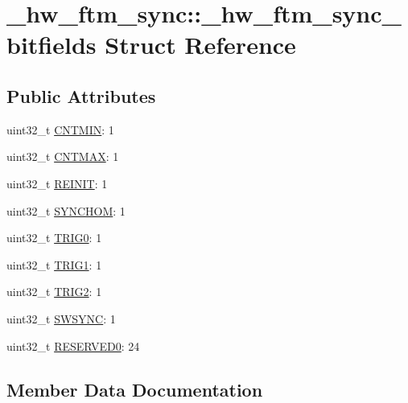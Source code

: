 \hypertarget{struct__hw__ftm__sync_1_1__hw__ftm__sync__bitfields}{}\section{\+\_\+hw\+\_\+ftm\+\_\+sync\+:\+:\+\_\+hw\+\_\+ftm\+\_\+sync\+\_\+bitfields Struct Reference}
\label{struct__hw__ftm__sync_1_1__hw__ftm__sync__bitfields}
\subsection*{Public Attributes}
\begin{DoxyCompactItemize}
\item 
uint32\+\_\+t \hyperlink{struct__hw__ftm__sync_1_1__hw__ftm__sync__bitfields_a13edc8c6f5b27e0fd01024896a210a90}{C\+N\+T\+M\+IN}\+: 1
\item 
uint32\+\_\+t \hyperlink{struct__hw__ftm__sync_1_1__hw__ftm__sync__bitfields_a528a1085734f901c36e665ba9facd349}{C\+N\+T\+M\+AX}\+: 1
\item 
uint32\+\_\+t \hyperlink{struct__hw__ftm__sync_1_1__hw__ftm__sync__bitfields_a1530460cab415fa245955a40722460bb}{R\+E\+I\+N\+IT}\+: 1
\item 
uint32\+\_\+t \hyperlink{struct__hw__ftm__sync_1_1__hw__ftm__sync__bitfields_a9b00704111fea19728562620e13d2ae9}{S\+Y\+N\+C\+H\+OM}\+: 1
\item 
uint32\+\_\+t \hyperlink{struct__hw__ftm__sync_1_1__hw__ftm__sync__bitfields_a5322fd5a4586d08fa00182e3d739e8da}{T\+R\+I\+G0}\+: 1
\item 
uint32\+\_\+t \hyperlink{struct__hw__ftm__sync_1_1__hw__ftm__sync__bitfields_ac6a31a466c50bb16ec45521116caf71b}{T\+R\+I\+G1}\+: 1
\item 
uint32\+\_\+t \hyperlink{struct__hw__ftm__sync_1_1__hw__ftm__sync__bitfields_a3f970aa073d94c19ab570ca1f01fd014}{T\+R\+I\+G2}\+: 1
\item 
uint32\+\_\+t \hyperlink{struct__hw__ftm__sync_1_1__hw__ftm__sync__bitfields_a4c4416e7665d9887604a7faa3efd97f0}{S\+W\+S\+Y\+NC}\+: 1
\item 
uint32\+\_\+t \hyperlink{struct__hw__ftm__sync_1_1__hw__ftm__sync__bitfields_a56bc071ca0fdac49063d0024502a550e}{R\+E\+S\+E\+R\+V\+E\+D0}\+: 24
\end{DoxyCompactItemize}


\subsection{Member Data Documentation}
